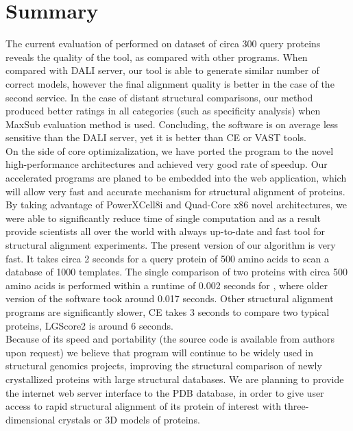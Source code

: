 \section{Summary}
The current evaluation of \prog{} performed on dataset of circa 300 query proteins
reveals the quality of the tool, as compared with other programs. When compared
with DALI server, our tool is able to generate similar number of correct models, however
the final alignment quality is better in the case of the second service. In the 
case of distant structural comparisons, our method produced better ratings in all categories
(such as specificity analysis) when MaxSub evaluation method is used.
Concluding, the \prog{} software is on average less sensitive than the DALI
server, yet it is better than CE or VAST tools.\\
On the side of core optimizalization, we have ported the \prog{} 
program to the novel high-performance
architectures and achieved very good rate of speedup.
Our accelerated programs are planed to be embedded into the web application,
which will allow very fast and accurate mechanism for structural alignment of
proteins.
By taking advantage of PowerXCell8i and Quad-Core x86 novel architectures,
we were able to significantly reduce time of single computation and as a result
provide scientists all over the world with always up-to-date and fast tool for
structural alignment experiments.
The present version of our algorithm is very fast. It takes circa 2 seconds 
for a query protein of 500 amino acids to scan a database of 1000 templates.
The single comparison of two proteins with circa 500 amino acids 
is performed within a runtime of 0.002 seconds for \prog{}, where 
older version of the software took around 0.017 seconds. Other structural
alignment programs are significantly slower, CE takes 3 seconds to compare two
typical proteins, LGScore2 is around 6 seconds. \\
Because of its speed and portability (the source code is available from authors 
upon request) we believe that \prog{} program will continue to be widely used
in structural genomics projects, improving the structural comparison of  newly crystallized
proteins with large structural databases. We are planning to provide the internet web
server interface to the PDB database, in order to give user access to rapid structural 
alignment of its protein of interest with three-dimensional crystals or 3D models
of proteins. 

